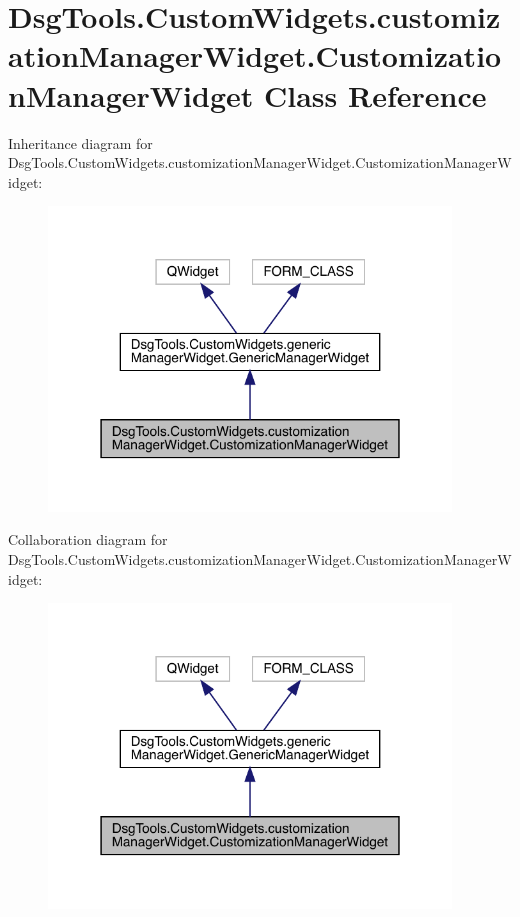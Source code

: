 \hypertarget{class_dsg_tools_1_1_custom_widgets_1_1customization_manager_widget_1_1_customization_manager_widget}{}\section{Dsg\+Tools.\+Custom\+Widgets.\+customization\+Manager\+Widget.\+Customization\+Manager\+Widget Class Reference}
\label{class_dsg_tools_1_1_custom_widgets_1_1customization_manager_widget_1_1_customization_manager_widget}


Inheritance diagram for Dsg\+Tools.\+Custom\+Widgets.\+customization\+Manager\+Widget.\+Customization\+Manager\+Widget\+:
\nopagebreak
\begin{figure}[H]
\begin{center}
\leavevmode
\includegraphics[width=303pt]{class_dsg_tools_1_1_custom_widgets_1_1customization_manager_widget_1_1_customization_manager_widget__inherit__graph}
\end{center}
\end{figure}


Collaboration diagram for Dsg\+Tools.\+Custom\+Widgets.\+customization\+Manager\+Widget.\+Customization\+Manager\+Widget\+:
\nopagebreak
\begin{figure}[H]
\begin{center}
\leavevmode
\includegraphics[width=303pt]{class_dsg_tools_1_1_custom_widgets_1_1customization_manager_widget_1_1_customization_manager_widget__coll__graph}
\end{center}
\end{figure}
